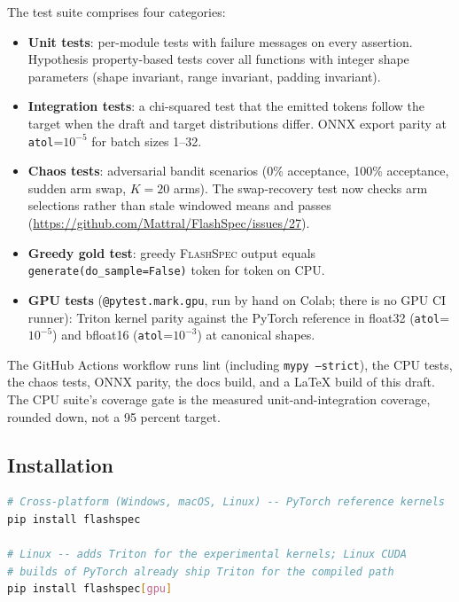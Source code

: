 \documentclass[11pt]{article}
\newcommand{\flashspec}{\textsc{FlashSpec}}
\begin{document}
The test suite comprises four categories:

\begin{itemize}
  \item \textbf{Unit tests}: per-module tests with failure messages on every
        assertion. Hypothesis property-based tests cover all functions with
        integer shape parameters (shape invariant, range invariant,
        padding invariant).
  \item \textbf{Integration tests}: a chi-squared test that the emitted
        tokens follow the target when the draft and target distributions
        differ.
        ONNX export parity at \texttt{atol}=$10^{-5}$ for batch sizes 1--32.
  \item \textbf{Chaos tests}: adversarial bandit scenarios (0\% acceptance,
        100\% acceptance, sudden arm swap, $K=20$ arms).
        The swap-recovery test now checks arm selections rather than
        stale windowed means and passes
        (\url{https://github.com/Mattral/FlashSpec/issues/27}).
  \item \textbf{Greedy gold test}: greedy \flashspec{} output equals
        \texttt{generate(do\_sample=False)} token for token on CPU.
  \item \textbf{GPU tests} (\texttt{@pytest.mark.gpu}, run by hand on
        Colab; there is no GPU CI runner):
        Triton kernel parity against the PyTorch reference in float32
        (\texttt{atol}=$10^{-5}$) and bfloat16 (\texttt{atol}=$10^{-3}$)
        at canonical shapes.
\end{itemize}

The GitHub Actions workflow runs lint (including \texttt{mypy --strict}),
the CPU tests, the chaos tests, ONNX parity, the docs build, and a LaTeX
build of this draft.
The CPU suite's coverage gate is the measured unit-and-integration
coverage, rounded down, not a 95 percent target.

\subsection{Installation}

\begin{lstlisting}[language=bash]
# Cross-platform (Windows, macOS, Linux) -- PyTorch reference kernels
pip install flashspec

# Linux -- adds Triton for the experimental kernels; Linux CUDA
# builds of PyTorch already ship Triton for the compiled path
pip install flashspec[gpu]
\end{lstlisting}
\end{document}
